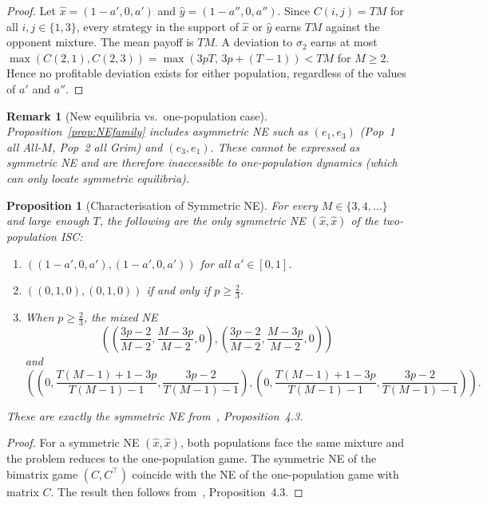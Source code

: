 \documentclass[12pt,a4paper]{article}
\newtheorem{proposition}{Proposition}[section]
\newtheorem{remark}{Remark}[section]
\begin{document}
\begin{proof}
Let $\hat x=(1-a',0,a')$ and $\hat y=(1-a'',0,a'')$.  Since $C(i,j)=TM$ for all
$i,j\in\{1,3\}$, every strategy in the support of $\hat x$ or $\hat y$ earns
$TM$ against the opponent mixture.  The mean payoff is $TM$.  A deviation to
$\sigma_2$ earns at most $\max(C(2,1),C(2,3))=\max(3pT,\,3p+(T-1))<TM$ for $M\geq 2$.
Hence no profitable deviation exists for either population, regardless of the
values of $a'$ and $a''$.
\end{proof}

\begin{remark}[New equilibria vs.\ one-population case]
Proposition~\ref{prop:NEfamily} includes \emph{asymmetric} NE such as
$(e_1,e_3)$ (Pop~1 all All-$M$, Pop~2 all Grim) and $(e_3,e_1)$.  These cannot
be expressed as symmetric NE and are therefore inaccessible to
one-population dynamics (which can only locate symmetric equilibria).
\end{remark}

\begin{proposition}[Characterisation of Symmetric NE]\label{prop:symNE}
For every $M\in\{3,4,\ldots\}$ and large enough $T$, the following are the only
symmetric NE $(\hat x,\hat x)$ of the two-population ISC:
\begin{enumerate}
  \item $((1-a',0,a'),(1-a',0,a'))$ for all $a'\in[0,1]$.
  \item $((0,1,0),(0,1,0))$ if and only if $p\geq\tfrac{2}{3}$.
  \item When $p\geq\tfrac{2}{3}$, the mixed NE
        \[\left(\!\left(\frac{3p-2}{M-2},\frac{M-3p}{M-2},0\right),
                \left(\frac{3p-2}{M-2},\frac{M-3p}{M-2},0\right)\!\right)\]
        and
        \[\left(\!\left(0,\frac{T(M-1)+1-3p}{T(M-1)-1},\frac{3p-2}{T(M-1)-1}\right),
                \left(0,\frac{T(M-1)+1-3p}{T(M-1)-1},\frac{3p-2}{T(M-1)-1}\right)\!\right).\]
\end{enumerate}
These are exactly the symmetric NE from~\cite{LK2026}, Proposition~4.3.
\end{proposition}

\begin{proof}
For a symmetric NE $(\hat x,\hat x)$, both populations face the same mixture and
the problem reduces to the one-population game.  The symmetric NE of the
bimatrix game $(C,C^\top)$ coincide with the NE of the one-population game with
matrix $C$.  The result then follows from~\cite{LK2026}, Proposition~4.3.
\end{proof}
\end{document}
